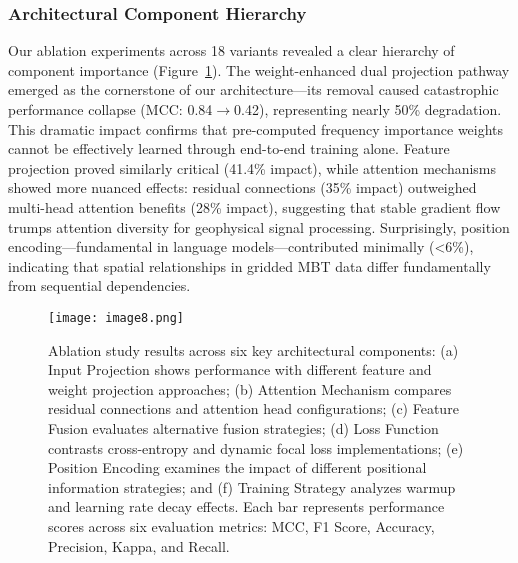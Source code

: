 \documentclass[fleqn,10pt]{wlscirep_mdpi_style}
\begin{document}
\subsubsection{Architectural Component Hierarchy}
Our ablation experiments across 18 variants revealed a clear hierarchy of component importance (Figure~\ref{fig:fig8}). The weight-enhanced dual projection pathway emerged as the cornerstone of our architecture—its removal caused catastrophic performance collapse (MCC: 0.84$\rightarrow$0.42), representing nearly 50\% degradation. This dramatic impact confirms that pre-computed frequency importance weights cannot be effectively learned through end-to-end training alone. Feature projection proved similarly critical (41.4\% impact), while attention mechanisms showed more nuanced effects: residual connections (35\% impact) outweighed multi-head attention benefits (28\% impact), suggesting that stable gradient flow trumps attention diversity for geophysical signal processing. Surprisingly, position encoding—fundamental in language models—contributed minimally (<6\%), indicating that spatial relationships in gridded MBT data differ fundamentally from sequential dependencies.

\begin{figure}[!htbp]
\centering
 \texttt{[image: image8.png]}
\caption{Ablation study results across six key architectural components: (a) Input Projection shows performance with different feature and weight projection approaches; (b) Attention Mechanism compares residual connections and attention head configurations; (c) Feature Fusion evaluates alternative fusion strategies; (d) Loss Function contrasts cross-entropy and dynamic focal loss implementations; (e) Position Encoding examines the impact of different positional information strategies; and (f) Training Strategy analyzes warmup and learning rate decay effects. Each bar represents performance scores across six evaluation metrics: MCC, F1 Score, Accuracy, Precision, Kappa, and Recall.}
\label{fig:fig8}
\end{figure}
\end{document}
